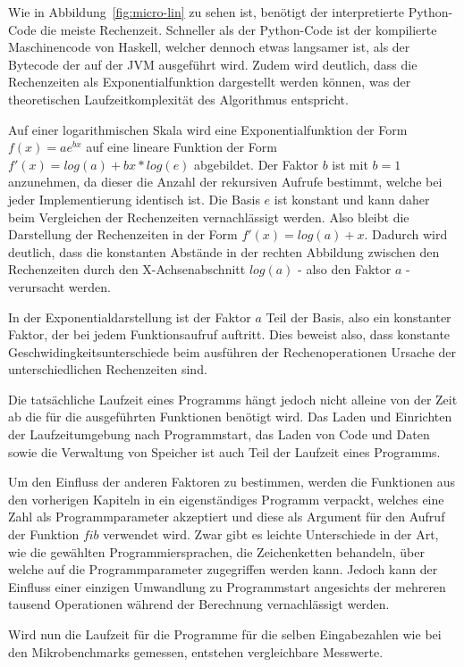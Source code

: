 \documentclass[11pt, parskip=half]{scrartcl}       %
\begin{document}
Wie in Abbildung~\ref{fig:micro-lin} zu sehen ist, benötigt der interpretierte Python-Code die meiste Rechenzeit.
Schneller als der Python-Code ist der kompilierte Maschinencode von Haskell, welcher dennoch etwas langsamer ist, als der Bytecode der auf der JVM ausgeführt wird.
Zudem wird deutlich, dass die Rechenzeiten als Exponentialfunktion dargestellt werden können, was der theoretischen Laufzeitkomplexität des Algorithmus entspricht.

Auf einer logarithmischen Skala wird eine Exponentialfunktion der Form $f(x) = ae^{bx}$ auf eine lineare Funktion der Form $f'(x) = log(a) + bx * log(e)$ abgebildet.
Der Faktor $b$ ist mit $b = 1$ anzunehmen, da dieser die Anzahl der rekursiven Aufrufe bestimmt, welche bei jeder Implementierung identisch ist.
Die Basis $e$ ist konstant und kann daher beim Vergleichen der Rechenzeiten vernachlässigt werden.
Also bleibt die Darstellung der Rechenzeiten in der Form $f'(x) = log(a) + x$.
Dadurch wird deutlich, dass die konstanten Abstände in der rechten Abbildung zwischen den Rechenzeiten durch den X-Achsenabschnitt $log(a)$ - also den Faktor $a$ - verursacht werden.

In der Exponentialdarstellung ist der Faktor $a$ Teil der Basis, also ein konstanter Faktor, der bei jedem Funktionsaufruf auftritt.
Dies beweist also, dass konstante Geschwidingkeitsunterschiede beim ausführen der Rechenoperationen Ursache der unterschiedlichen Rechenzeiten sind.


Die tatsächliche Laufzeit eines Programms hängt jedoch nicht alleine von der Zeit ab die für die ausgeführten Funktionen benötigt wird.
Das Laden und Einrichten der Laufzeitumgebung nach Programmstart, das Laden von Code und Daten sowie die Verwaltung von Speicher ist auch Teil der Laufzeit eines Programms.

Um den Einfluss der anderen Faktoren zu bestimmen, werden die Funktionen aus den vorherigen Kapiteln in ein eigenständiges Programm verpackt, welches eine Zahl als Programmparameter akzeptiert und diese als Argument für den Aufruf der Funktion $fib$ verwendet wird.
Zwar gibt es leichte Unterschiede in der Art, wie die gewählten Programmiersprachen, die Zeichenketten behandeln, über welche auf die Programmparameter zugegriffen werden kann.
Jedoch kann der Einfluss einer einzigen Umwandlung zu Programmstart angesichts der mehreren tausend Operationen während der Berechnung vernachlässigt werden.

Wird nun die Laufzeit für die Programme für die selben Eingabezahlen wie bei den Mikrobenchmarks gemessen, entstehen vergleichbare Messwerte.
\end{document}
